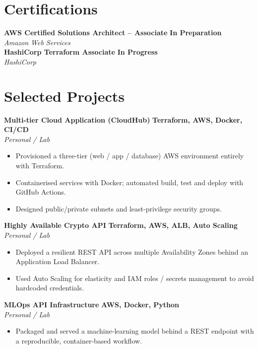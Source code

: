 \documentclass[11pt,a4paper]{article}
\newcommand{\entry}[4]{%
  \textbf{#1} \hfill \textbf{\color{grey}#2}\\
  \textit{\color{awsorange}#3} \hfill \textit{\color{grey}#4}\\[2pt]
}
\begin{document}
\section{Certifications}
\textbf{AWS Certified Solutions Architect -- Associate} \hfill \textbf{\color{grey}In Preparation}\\
\textit{\color{grey}Amazon Web Services}\\[4pt]
\textbf{HashiCorp Terraform Associate} \hfill \textbf{\color{grey}In Progress}\\
\textit{\color{grey}HashiCorp}

\section{Selected Projects}

\entry{Multi-tier Cloud Application (CloudHub)}{Terraform, AWS, Docker, CI/CD}{Personal / Lab}{}
\vspace{-6pt}
\begin{itemize}[leftmargin=14pt, itemsep=1pt, topsep=2pt]
  \item Provisioned a three-tier (web / app / database) AWS environment entirely with Terraform.
  \item Containerised services with Docker; automated build, test and deploy with GitHub Actions.
  \item Designed public/private subnets and least-privilege security groups.
\end{itemize}

\entry{Highly Available Crypto API}{Terraform, AWS, ALB, Auto Scaling}{Personal / Lab}{}
\vspace{-6pt}
\begin{itemize}[leftmargin=14pt, itemsep=1pt, topsep=2pt]
  \item Deployed a resilient REST API across multiple Availability Zones behind an Application Load Balancer.
  \item Used Auto Scaling for elasticity and IAM roles / secrets management to avoid hardcoded credentials.
\end{itemize}

\entry{MLOps API Infrastructure}{AWS, Docker, Python}{Personal / Lab}{}
\vspace{-6pt}
\begin{itemize}[leftmargin=14pt, itemsep=1pt, topsep=2pt]
  \item Packaged and served a machine-learning model behind a REST endpoint with a reproducible, container-based workflow.
\end{itemize}
\end{document}
